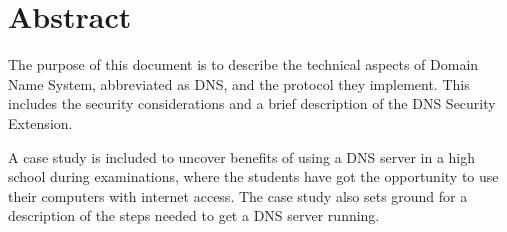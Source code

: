 \chapter*{Abstract}

The purpose of this document is to describe the technical aspects of Domain Name System, abbreviated as DNS, and the protocol they implement. This includes the security considerations and a brief description of the DNS Security Extension.

A case study is included to uncover benefits of using a DNS server in a high school during examinations, where the students have got the opportunity to use their computers with internet access. The case study also sets ground for a description of the steps needed to get a DNS server running. 